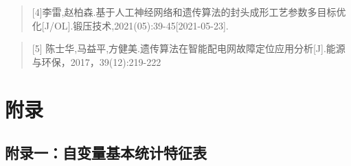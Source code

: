 \documentclass[
]{article}
\begin{document}
\begin{quote}
{[}4{]}李雷,赵柏森.基于人工神经网络和遗传算法的封头成形工艺参数多目标优化{[}J/OL{]}.锻压技术,2021(05):39-45{[}2021-05-23{]}.
\end{quote}

\begin{quote}
{[}5{]}
陈士华,马益平,方健美.遗传算法在智能配电网故障定位应用分析{[}J{]}.能源与环保，2017，39(12):219-222
\end{quote}

\newpage

\hypertarget{ux9644ux5f55}{%
\section{附录}\label{ux9644ux5f55}}

\hypertarget{ux9644ux5f55ux4e00ux81eaux53d8ux91cfux57faux672cux7edfux8ba1ux7279ux5f81ux8868}{%
\subsection{附录一：自变量基本统计特征表}\label{ux9644ux5f55ux4e00ux81eaux53d8ux91cfux57faux672cux7edfux8ba1ux7279ux5f81ux8868}}
\end{document}
